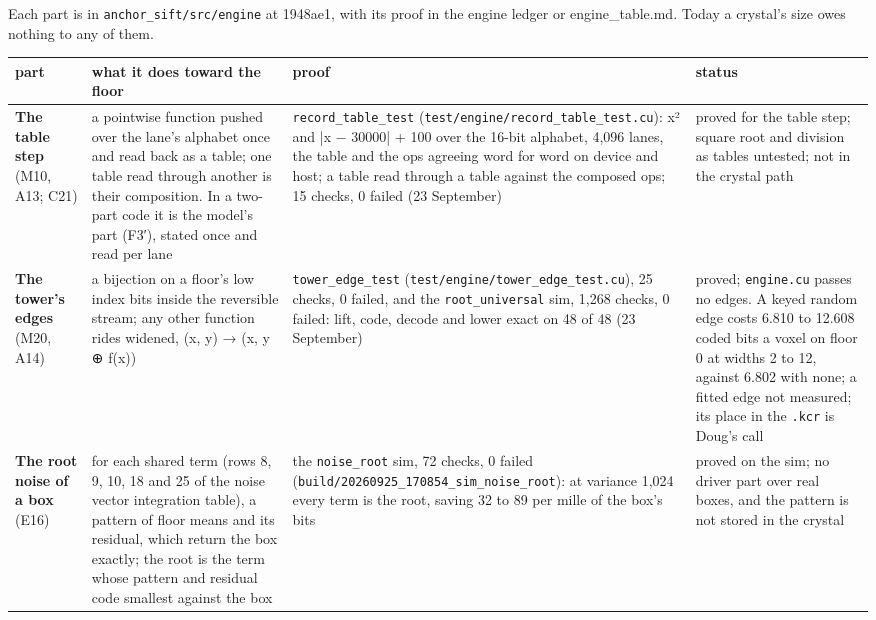 Each part is in \texttt{anchor\_\allowbreak{}sift/\allowbreak{}src/\allowbreak{}engine} at 1948ae1, with its proof in the engine ledger or engine\_\allowbreak{}table.md. Today a crystal's size owes nothing to any of them.

{\footnotesize
\setlength{\tabcolsep}{6pt}
\begin{longtable}{>{\RaggedRight\arraybackslash}p{}>{\RaggedRight\arraybackslash}p{}>{\RaggedRight\arraybackslash}p{}>{\RaggedRight\arraybackslash}p{}}
\toprule
part & what it does toward the floor & proof & status \\
\midrule
\endhead
\textbf{The table step} (M10, A13; C21) & a pointwise function pushed over the lane's alphabet once and read back as a table; one table read through another is their composition. In a two-part code it is the model's part (F3′), stated once and read per lane & \texttt{record\_\allowbreak{}table\_\allowbreak{}test} (\texttt{test/\allowbreak{}engine/\allowbreak{}record\_\allowbreak{}table\_\allowbreak{}test.\allowbreak{}cu}): x² and |x − 30000| + 100 over the 16-bit alphabet, 4,096 lanes, the table and the ops agreeing word for word on device and host; a table read through a table against the composed ops; 15 checks, 0 failed (23 September) & proved for the table step; square root and division as tables untested; not in the crystal path \\
\textbf{The tower's edges} (M20, A14) & a bijection on a floor's low index bits inside the reversible stream; any other function rides widened, (x, y) → (x, y ⊕ f(x)) & \texttt{tower\_\allowbreak{}edge\_\allowbreak{}test} (\texttt{test/\allowbreak{}engine/\allowbreak{}tower\_\allowbreak{}edge\_\allowbreak{}test.\allowbreak{}cu}), 25 checks, 0 failed, and the \texttt{root\_\allowbreak{}universal} sim, 1,268 checks, 0 failed: lift, code, decode and lower exact on 48 of 48 (23 September) & proved; \texttt{engine.\allowbreak{}cu} passes no edges. A keyed random edge costs 6.810 to 12.608 coded bits a voxel on floor 0 at widths 2 to 12, against 6.802 with none; a fitted edge not measured; its place in the \texttt{.\allowbreak{}kcr} is Doug's call \\
\textbf{The root noise of a box} (E16) & for each shared term (rows 8, 9, 10, 18 and 25 of the noise vector integration table), a pattern of floor means and its residual, which return the box exactly; the root is the term whose pattern and residual code smallest against the box & the \texttt{noise\_\allowbreak{}root} sim, 72 checks, 0 failed (\texttt{build/\allowbreak{}20260925\_\allowbreak{}170854\_\allowbreak{}sim\_\allowbreak{}noise\_\allowbreak{}root}): at variance 1,024 every term is the root, saving 32 to 89 per mille of the box's bits & proved on the sim; no driver part over real boxes, and the pattern is not stored in the crystal \\

\end{longtable}}
